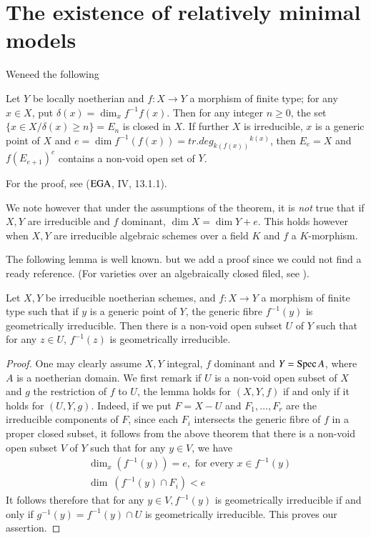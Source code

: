 
\chapter{The existence of relatively minimal models}\label{chap7}%


We\pageoriginale need the following

\begin{theorem*}%
  Let $Y$ be locally noetherian and $f : X \rightarrow Y$ a morphism
  of finite type; for any $x \in X$, put $\delta (x)= \dim_x f^{-1}
  f(x)$. Then for any integer $n \ge 0$, the set $\{x \in X / \delta
  (x) \ge n\} = E_n$ is closed in $X$. If further $X$ is irreducible,
  $x$ is a generic point of $X$ and $e=\dim f^{-1}(f(x))=
  tr. deg_{k(f(x))}{^{k(x)}}$, then  $E_e = X$ and $f(E_{e+1})^c$
  contains a non-void open set of $Y$.  
\end{theorem*}

For the proof, see ($\operatorname{EGA}$, IV, 13.1.1).

We note however that under the assumptions of the theorem, it is
\textit{ not } true that if $X, Y$ are irreducible and $f$ dominant,
$\dim X= \dim Y+e$. This holds however when $X,Y$ are irreducible
algebraic schemes over a field $K$ and $f$ a $K$-morphism. 

The following lemma is well known. but we add a proof since we could
not find a ready reference. (For varieties over an algebraically
closed filed, see \cite{key12}). 

\begin{lemma*}%
  Let $X,Y$ be irreducible noetherian schemes, and $f:X\rightarrow Y$
  a morphism of finite type such that if $y$ is a generic point of
  $Y$, the generic fibre $f^{-1}(y)$ is geometrically
  irreducible. Then there is a non-void open subset $U$ of $Y$ such
  that for any $z \in U$, $f^{-1} (z)$ is geometrically irreducible.  
\end{lemma*}

\begin{proof}
  One may clearly assume $X,Y$ integral, $f$ dominant and $Y=\operatorname{Spec} A$,
  where $A$ is a noetherian domain. We first remark if $U$ is a\pageoriginale
  non-void open subset of $X$ and $g$ the restriction of $f$ to $U$,
  the lemma holds for $(X, Y,f)$ if and only if it holds for $(U, Y,
  g)$. Indeed, if we put $F = X -U$ and $F_1 ,\ldots,F_r$  are the
  irreducible components of $F$, since each $F_i$ intersects  the
  generic fibre of $f$ in a proper closed subset, it follows from the
  above theorem that there is a  non-void open subset $V$ of $Y$ such
  that for any $y \in V$, we have  
  \begin{align*}
    &\dim_x (f^{-1}(y))=e, \text{ for every } x \in f^{-1}(y)\\
    &\dim ~ (f^{-1}(y) \cap F_i) < e
  \end{align*}
  It follows therefore that for any $ y \in V, f^{-1}(y)$ is
  geometrically irreducible if and only if $g^{-1} (y) = f^{-1} (y) \cap
  U$ is geometrically irreducible. This proves our assertion.
\end{proof}

